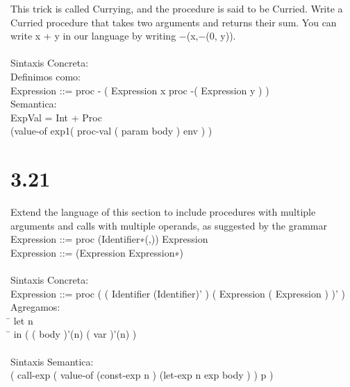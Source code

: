 \documentclass{article}
\begin{document}
\begin{tab}
This trick is called Currying, and the procedure is said to be Curried. Write a Curried procedure that takes two arguments and returns their sum. You can write x + y in our language by writing −(x,−(0, y)).\\ \\

Sintaxis Concreta:\\
Definimos como:\\
Expression ::= proc - ( Expression x proc -( Expression y ) )\\

Semantica:\\
ExpVal = Int + Proc\\
(value-of exp1( proc-val ( param body ) env ) )

\newpage
\section{ 3.21 } 
Extend the language of this section to include procedures with multiple arguments and calls with multiple operands, as suggested by the grammar \\
Expression ::= proc ({Identifier}∗(,)) Expression\\
Expression ::= (Expression {Expression}∗)\\ \\

Sintaxis Concreta:\\
Expression ::= proc ( ( {Identifier} (Identifier)' ) ( Expression ( Expression ) )' )\\
Agregamos:\\
\= \> let n\\
\= \> in ( ( body )'(n) ( var )'(n) )\\ \\

Sintaxis Semantica:\\
( call-exp (  value-of (const-exp n ) (let-exp n exp body ) ) p )\\



\newpage

\end{tab}
\end{document}

